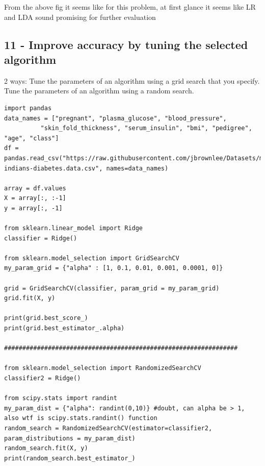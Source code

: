 \documentclass[11pt]{article}
\begin{document}
From the above fig it seems like for this problem, at first glance it seems
like LR and LDA sound promising for further evaluation



\subsection{11 - Improve accuracy by tuning the selected algorithm}
\label{sec:orgd2971cf}
2 ways:
Tune the parameters of an algorithm using a grid search that you specify.
Tune the parameters of an algorithm using a random search.

\begin{verbatim}
import pandas
data_names = ["pregnant", "plasma_glucose", "blood_pressure", 
	      "skin_fold_thickness", "serum_insulin", "bmi", "pedigree", "age", "class"]
df = pandas.read_csv("https://raw.githubusercontent.com/jbrownlee/Datasets/master/pima-indians-diabetes.data.csv", names=data_names)

array = df.values
X = array[:, :-1]
y = array[:, -1]

from sklearn.linear_model import Ridge
classifier = Ridge()

from sklearn.model_selection import GridSearchCV
my_param_grid = {"alpha" : [1, 0.1, 0.01, 0.001, 0.0001, 0]}

grid = GridSearchCV(classifier, param_grid = my_param_grid)
grid.fit(X, y)

print(grid.best_score_)
print(grid.best_estimator_.alpha)

################################################################

from sklearn.model_selection import RandomizedSearchCV
classifier2 = Ridge()

from scipy.stats import randint
my_param_dist = {"alpha": randint(0,10)} #doubt, can alpha be > 1, also wtf is scipy.stats.randint() function
random_search = RandomizedSearchCV(estimator=classifier2, param_distributions = my_param_dist)
random_search.fit(X, y)
print(random_search.best_estimator_)

\end{verbatim}
\end{document}
